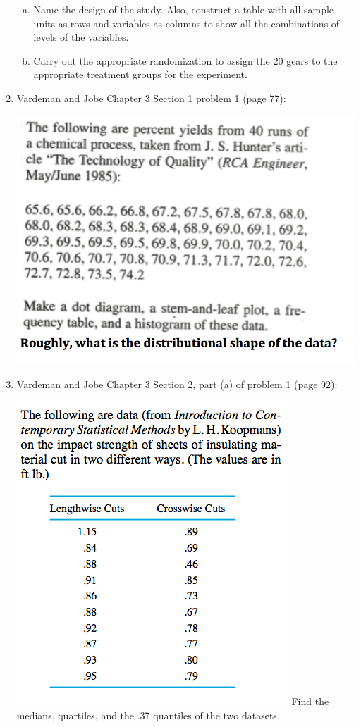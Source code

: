 \documentclass{article}\usepackage{graphicx, color}
\numberwithin{equation}{section}
\begin{document}
\begin{flushleft}
\begin{enumerate}[1. ]
\begin{enumerate}[a. ]
\item Name the design of the study. Also, construct a table with all sample units as rows and variables as columns to show all the combinations of levels of the variables.
\item Carry out the appropriate randomization to assign the 20 gears to the appropriate treatment groups for the experiment.
\end{enumerate}




\item Vardeman and Jobe Chapter 3 Section 1 problem 1 (page 77):

 \includegraphics{../../fig/ch3s1p1.png}



\item Vardeman and Jobe Chapter 3 Section 2, part (a) of problem 1 (page 92):

 \includegraphics{../../fig/ch3s2p1.png}
Find the medians, quartiles, and the .37 quantiles of the two datasets.




\end{enumerate}
\end{flushleft}
\end{document}

